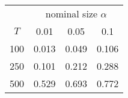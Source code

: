 % 
\begin{tabular}{cccc}
  \hline
  & \multicolumn{3}{c}{nominal size $\alpha$} \\
 $T$ & 0.01 & 0.05 & 0.1 \\
 \hline
100 & 0.013 & 0.049 & 0.106 \\ 
  250 & 0.101 & 0.212 & 0.288 \\ 
  500 & 0.529 & 0.693 & 0.772 \\ 
   \hline
\end{tabular}
